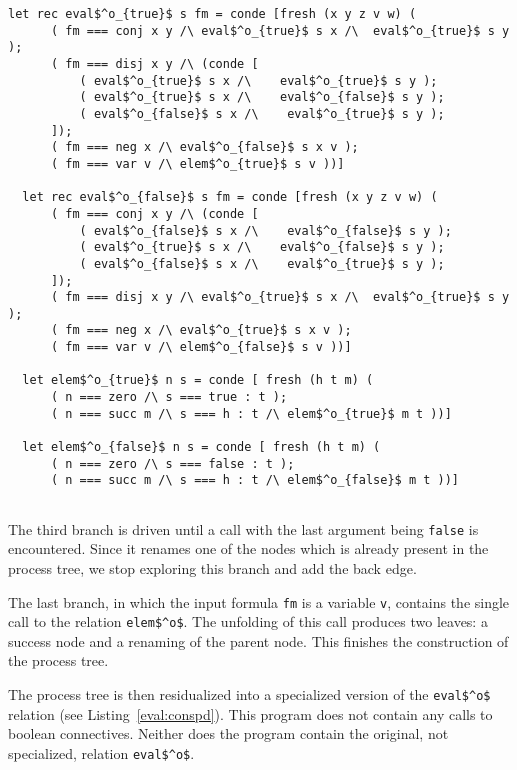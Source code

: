 \begin{figure*}[!t]
  \centering
  \begin{minipage}{0.65\textwidth}
    \begin{lstlisting}[label={eval:conspd}, caption={Specialized evaluator of propositional formulas}, captionpos=b, frame=tb]
  let rec eval$^o_{true}$ s fm = conde [fresh (x y z v w) (
      ( fm === conj x y /\ eval$^o_{true}$ s x /\  eval$^o_{true}$ s y );
      ( fm === disj x y /\ (conde [
          ( eval$^o_{true}$ s x /\    eval$^o_{true}$ s y );
          ( eval$^o_{true}$ s x /\    eval$^o_{false}$ s y );
          ( eval$^o_{false}$ s x /\    eval$^o_{true}$ s y );
      ]);
      ( fm === neg x /\ eval$^o_{false}$ s x v );
      ( fm === var v /\ elem$^o_{true}$ s v ))]

  let rec eval$^o_{false}$ s fm = conde [fresh (x y z v w) (
      ( fm === conj x y /\ (conde [
          ( eval$^o_{false}$ s x /\    eval$^o_{false}$ s y );
          ( eval$^o_{true}$ s x /\    eval$^o_{false}$ s y );
          ( eval$^o_{false}$ s x /\    eval$^o_{true}$ s y );
      ]);
      ( fm === disj x y /\ eval$^o_{true}$ s x /\  eval$^o_{true}$ s y );
      ( fm === neg x /\ eval$^o_{true}$ s x v );
      ( fm === var v /\ elem$^o_{false}$ s v ))]

  let elem$^o_{true}$ n s = conde [ fresh (h t m) (
      ( n === zero /\ s === true : t );
      ( n === succ m /\ s === h : t /\ elem$^o_{true}$ m t ))]

  let elem$^o_{false}$ n s = conde [ fresh (h t m) (
      ( n === zero /\ s === false : t );
      ( n === succ m /\ s === h : t /\ elem$^o_{false}$ m t ))]


    \end{lstlisting}
  \end{minipage}
\end{figure*}

The third branch is driven until a call with the last argument being \lstinline{false} is encountered.
Since it renames one of the nodes which is already present in the process tree, we stop exploring this branch and add the back edge.

The last branch, in which the input formula \lstinline{fm} is a variable \lstinline{v}, contains the single call to the relation \lstinline{elem$^o$}.
The unfolding of this call produces two leaves: a success node and a renaming of the parent node.
This finishes the construction of the process tree.

The process tree is then residualized into a specialized version of the \lstinline{eval$^o$} relation (see Listing~\ref{eval:conspd}).
This program does not contain any calls to boolean connectives.
Neither does the program contain the original, not specialized, relation \lstinline{eval$^o$}.

